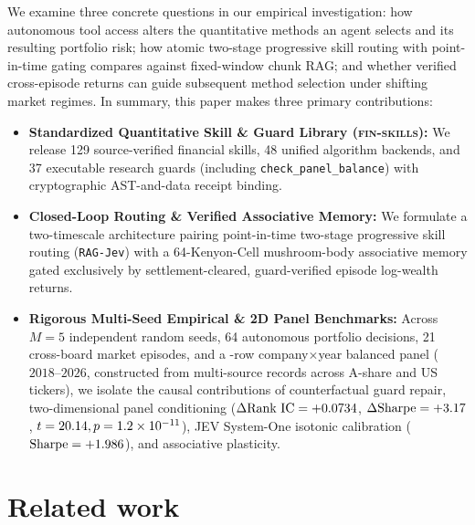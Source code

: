 \documentclass[11pt]{article}
\begin{document}
We examine three concrete questions in our empirical investigation: how autonomous tool
access alters the quantitative methods an agent selects and its resulting portfolio risk;
how atomic two-stage progressive skill routing with point-in-time gating compares against
fixed-window chunk RAG; and whether verified cross-episode returns can guide subsequent
method selection under shifting market regimes. In summary, this paper makes three primary
contributions:
\begin{itemize}
\item \textbf{Standardized Quantitative Skill \& Guard Library (\textsc{fin-skills}):} We release
129 source-verified financial skills, 48 unified algorithm backends, and 37 executable
research guards (including \texttt{check\_panel\_balance}) with cryptographic AST-and-data receipt binding.
\item \textbf{Closed-Loop Routing \& Verified Associative Memory:} We formulate a two-timescale
architecture pairing point-in-time two-stage progressive skill routing (\texttt{RAG-Jev}) with
a 64-Kenyon-Cell mushroom-body associative memory gated exclusively by settlement-cleared,
guard-verified episode log-wealth returns.
\item \textbf{Rigorous Multi-Seed Empirical \& 2D Panel Benchmarks:} Across $M=5$ independent
random seeds, 64 autonomous portfolio decisions, 21 cross-board market episodes, and a
\PanelBalancedRows{}-row company$\times$year balanced panel ($2018\text{--}2026$, constructed from
\CorpusTotalRecords{} multi-source records across \CorpusAnnounceTickers{} A-share and
\CorpusStockTwitsTickers{} US tickers), we isolate the causal contributions of counterfactual guard
repair, two-dimensional panel conditioning ($\Delta\text{Rank IC} = +0.0734{}$,
$\Delta\text{Sharpe} = +3.17{}$, $t = 20.14{}, p = 1.2\times 10^{-11}{}$),
JEV System-One isotonic calibration ($\text{Sharpe} = +1.986{}$), and associative plasticity.
\end{itemize}

\section{Related work}
\end{document}

